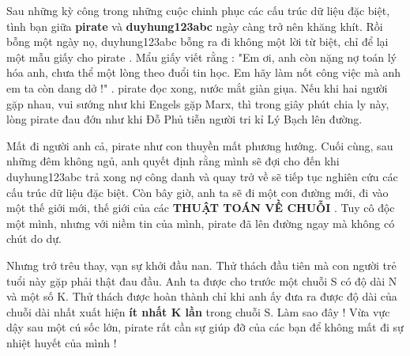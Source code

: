 Sau những kỳ công trong những cuộc chinh phục các cấu trúc dữ liệu đặc biệt, tình bạn giữa   \textbf{pirate}   và   \textbf{duyhung123abc}   ngày càng trở nên khăng khít. Rồi bỗng một ngày nọ,   duyhung123abc   bỗng ra đi không một lời từ biệt, chỉ để lại một mẫu giấy cho   pirate   . Mẩu giấy viết rằng :   "Em ơi, anh còn nặng nợ toán lý hóa anh, chưa thể một lòng theo đuổi tin học. Em hãy làm nốt công việc mà anh em ta còn dang dở !"   .   pirate   đọc xong, nước mắt giàn giụa. Nếu khi hai người gặp nhau, vui sướng như khi Engels gặp Marx, thì trong giây phút chia ly này, lòng   pirate   đau đớn như khi Đỗ Phủ tiễn người tri kỉ Lý Bạch lên đường.  

   Mất đi người anh cả,   pirate   như con thuyền mất phương hướng. Cuối cùng, sau những đêm không ngủ, anh quyết định rằng mình sẽ đợi cho đến khi   duyhung123abc   trả xong nợ công danh và quay trở về sẽ tiếp tục nghiên cứu các cấu trúc dữ liệu đặc biệt. Còn bây giờ, anh ta sẽ đi một con đường mới, đi vào một thế giới mới, thế giới của các   \textbf{    THUẬT TOÁN VỀ CHUỖI   }   . Tuy cô độc một mình, nhưng với niềm tin của mình,   pirate   đã lên đường ngay mà không có chút do dự.  

   Nhưng trớ trêu thay, vạn sự khởi đầu nan. Thử thách đầu tiên mà con người trẻ tuổi này gặp phải thật đau đầu. Anh ta được cho trước một chuỗi S có độ dài N và một số K. Thử thách được hoàn thành chỉ khi anh ấy đưa ra được độ dài của chuỗi dài nhất xuất hiện   \textbf{    ít nhất K lần   }   trong chuỗi S. Làm sao đây ! Vừa vực dậy sau một cú sốc lớn,   pirate   rất cần sự giúp đỡ của các bạn để không mất đi sự nhiệt huyết của mình !